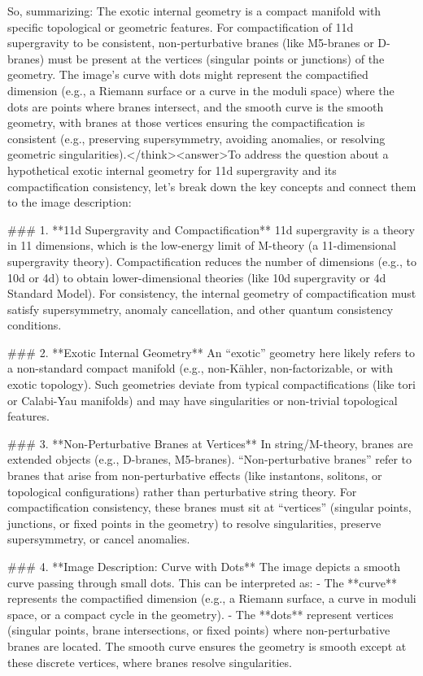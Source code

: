 So, summarizing: The exotic internal geometry is a compact manifold with specific topological or geometric features. For compactification of 11d supergravity to be consistent, non-perturbative branes (like M5-branes or D-branes) must be present at the vertices (singular points or junctions) of the geometry. The image's curve with dots might represent the compactified dimension (e.g., a Riemann surface or a curve in the moduli space) where the dots are points where branes intersect, and the smooth curve is the smooth geometry, with branes at those vertices ensuring the compactification is consistent (e.g., preserving supersymmetry, avoiding anomalies, or resolving geometric singularities).</think><answer>To address the question about a hypothetical exotic internal geometry for 11d supergravity and its compactification consistency, let’s break down the key concepts and connect them to the image description:  


### 1. **11d Supergravity and Compactification**  
11d supergravity is a theory in 11 dimensions, which is the low-energy limit of M-theory (a 11-dimensional supergravity theory). Compactification reduces the number of dimensions (e.g., to 10d or 4d) to obtain lower-dimensional theories (like 10d supergravity or 4d Standard Model). For consistency, the internal geometry of compactification must satisfy supersymmetry, anomaly cancellation, and other quantum consistency conditions.  


### 2. **Exotic Internal Geometry**  
An “exotic” geometry here likely refers to a non-standard compact manifold (e.g., non-Kähler, non-factorizable, or with exotic topology). Such geometries deviate from typical compactifications (like tori or Calabi-Yau manifolds) and may have singularities or non-trivial topological features.  


### 3. **Non-Perturbative Branes at Vertices**  
In string/M-theory, branes are extended objects (e.g., D-branes, M5-branes). “Non-perturbative branes” refer to branes that arise from non-perturbative effects (like instantons, solitons, or topological configurations) rather than perturbative string theory. For compactification consistency, these branes must sit at “vertices” (singular points, junctions, or fixed points in the geometry) to resolve singularities, preserve supersymmetry, or cancel anomalies.  


### 4. **Image Description: Curve with Dots**  
The image depicts a smooth curve passing through small dots. This can be interpreted as:  
- The **curve** represents the compactified dimension (e.g., a Riemann surface, a curve in moduli space, or a compact cycle in the geometry).  
- The **dots** represent vertices (singular points, brane intersections, or fixed points) where non-perturbative branes are located. The smooth curve ensures the geometry is smooth except at these discrete vertices, where branes resolve singularities.  



